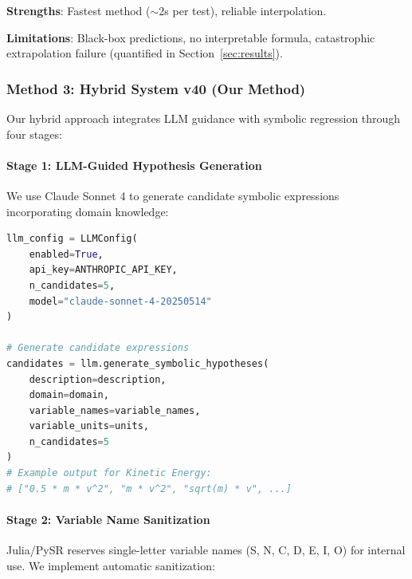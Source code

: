 \documentclass[twoside,11pt]{article}
\begin{document}
\textbf{Strengths}: Fastest method ($\sim$2s per test), reliable interpolation.

\textbf{Limitations}: Black-box predictions, no interpretable formula, catastrophic extrapolation failure (quantified in Section~\ref{sec:results}).


\subsubsection{Method 3: Hybrid System v40 (Our Method)}

Our hybrid approach integrates LLM guidance with symbolic regression through four stages:

\paragraph{Stage 1: LLM-Guided Hypothesis Generation}

We use Claude Sonnet 4 to generate candidate symbolic expressions incorporating domain knowledge:

\begin{lstlisting}[language=Python, caption=LLM Hypothesis Generation]
llm_config = LLMConfig(
    enabled=True,
    api_key=ANTHROPIC_API_KEY,
    n_candidates=5,
    model="claude-sonnet-4-20250514"
)

# Generate candidate expressions
candidates = llm.generate_symbolic_hypotheses(
    description=description,
    domain=domain,
    variable_names=variable_names,
    variable_units=units,
    n_candidates=5
)
# Example output for Kinetic Energy:
# ["0.5 * m * v^2", "m * v^2", "sqrt(m) * v", ...]
\end{lstlisting}

\paragraph{Stage 2: Variable Name Sanitization}

Julia/PySR reserves single-letter variable names (S, N, C, D, E, I, O) for internal use. We implement automatic sanitization:
\end{document}
